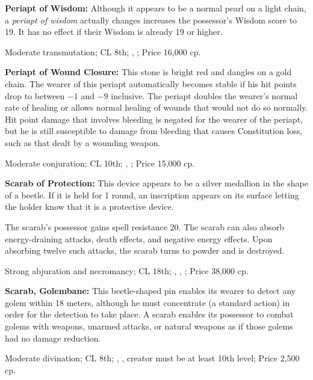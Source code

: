 \textbf{Periapt of Wisdom:} Although it appears to be a normal pearl on a light chain, a \emph{periapt of wisdom} actually changes increases the possessor's Wisdom score to 19. It has no effect if their Wisdom is already 19 or higher.

Moderate transmutation; CL 8th; , ; Price 16,000 cp.


\textbf{Periapt of Wound Closure:} This stone is bright red and dangles on a gold chain. The wearer of this periapt automatically becomes stable if his hit points drop to between $-1$ and $-9$ inclusive. The periapt doubles the wearer's normal rate of healing or allows normal healing of wounds that would not do so normally. Hit point damage that involves bleeding is negated for the wearer of the periapt, but he is still susceptible to damage from bleeding that causes Constitution loss, such as that dealt by a wounding weapon.

Moderate conjuration; CL 10th; , ; Price 15,000 cp.


\textbf{Scarab of Protection:} This device appears to be a silver medallion in the shape of a beetle. If it is held for 1 round, an inscription appears on its surface letting the holder know that it is a protective device.

The scarab's possessor gains spell resistance 20. The scarab can also absorb energy-draining attacks, death effects, and negative energy effects. Upon absorbing twelve such attacks, the scarab turns to powder and is destroyed.

Strong abjuration and necromancy; CL 18th; , , ; Price 38,000 cp.


\textbf{Scarab, Golembane:} This beetle-shaped pin enables its wearer to detect any golem within 18 meters, although he must concentrate (a standard action) in order for the detection to take place. A scarab enables its possessor to combat golems with weapons, unarmed attacks, or natural weapons as if those golems had no damage reduction.

Moderate divination; CL 8th; , , creator must be at least 10th level; Price 2,500 cp.

